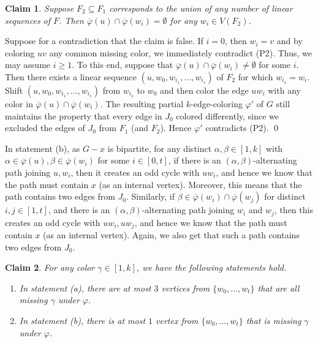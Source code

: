 \documentclass[11pt, oneside]{article}
\newcommand{\pbar}{\overline{\varphi}}
\newtheorem{claim}{Claim}
\begin{document}
\begin{claim}\label{uwi} Suppose $F_2\subseteq F_1$ corresponds to the union of any number of linear sequences of $F$. Then $\pbar(u)\cap \pbar(w_i) =\emptyset$ for any $w_i\in V(F_2)$.
\end{claim}

 Suppose for a contradiction that the claim is false. If $i=0$, then $w_i=v$ and by coloring $uv$ any common missing color, we immediately contradict (P2). Thus, we may assume $i\geq 1$. To this end, suppose that $\pbar(u)\cap \pbar(w_i) \ne \emptyset$ for some $i$. Then there exists a linear sequence $(u, w_0, w_{i_1}, \ldots, w_{i_s})$ of $F_2$ for which $w_{i_s}=w_i$. Shift $(u, w_0, w_{i_1}, \ldots, w_{i_s})$ 
from $w_{i_s}$ to $w_0$ and then color the edge $uw_i$ with any color in $\pbar(u)\cap \pbar(w_i)$. The resulting partial $k$-edge-coloring  $\varphi'$ of $G$ still maintains the property that every edge in $J_0$  colored differently, since we excluded the edges of $J_0$ from $F_1$ (and $F_2$). Hence $\varphi'$ contradicts (P2).
\qed


In statement (b), as $G-x$ is bipartite,  for any  distinct $\alpha, \beta  \in [1,k]$ with $\alpha \in \pbar(u), \beta \in \pbar(w_i)$
for some $i\in [0,t]$,  if there is an  $(\alpha,\beta)$-alternating path joining $u, w_i$, then it creates an odd cycle with $uw_i$, and hence we know  that the path must contain $x$ (as an internal vertex). Moreover, this means that the path contains two edges from $J_0$.
Similarly, if $\beta \in \pbar(w_i)\cap \pbar(w_j)$ for 
distinct $i,j\in [1,t]$, and there is an $(\alpha,\beta)$-alternating path joining $w_i$ and $w_j$, then this creates an odd cycle with $uw_i, uw_j$, and hence we know that the path must contain $x$ (as an internal vertex). Again, we also get that such a path contains two edges from $J_0$. 



\begin{claim}\label{gamma} For any color $\gamma \in [1,k]$,  we have the following statements hold. 
\begin{enumerate}[(1)]
    \item In statement (a),  there are at most  $3$  vertices from $\{w_0, \ldots, w_t\}$ that are all missing $\gamma$ under $\varphi$.
    \item In statement (b),  there is at  most  $1$  vertex from $\{w_0, \ldots, w_t\}$ that is  missing $\gamma$ under $\varphi$.
\end{enumerate}
\end{claim} 
	
\end{document}
